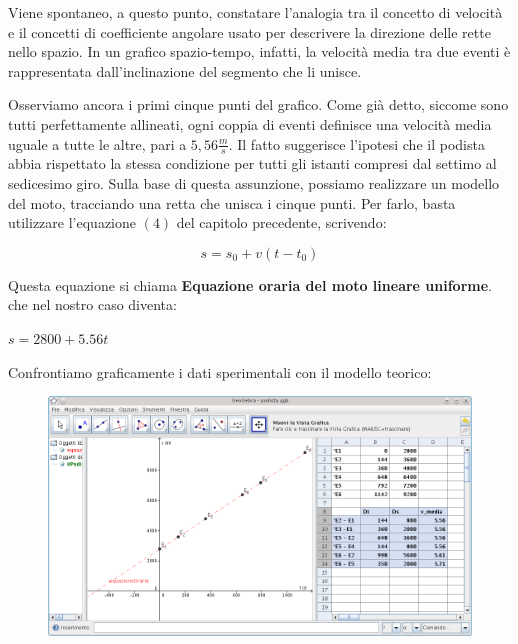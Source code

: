 Viene spontaneo, a questo punto, constatare l'analogia tra il concetto di velocità e il concetti di coefficiente angolare usato per descrivere la direzione delle rette nello spazio. In un grafico spazio-tempo, infatti, la velocità media tra due eventi è rappresentata dall'inclinazione del segmento che li unisce.
\newline

Osserviamo ancora i primi cinque punti del grafico. Come già detto, siccome sono tutti perfettamente allineati, ogni coppia di eventi definisce una velocità media uguale a tutte le altre, pari a $5,56 \frac ms$. Il fatto suggerisce l'ipotesi che il podista abbia rispettato la stessa condizione per tutti gli istanti compresi dal settimo al sedicesimo giro. Sulla base di questa assunzione, possiamo realizzare un modello del moto, tracciando una retta che unisca i cinque punti. Per farlo, basta utilizzare l'equazione $(4)$ del capitolo precedente, scrivendo:
\begin{center}
\begin{equation}
\label{eq:Equazione oraria del moto lineare uniforme}
s = s_0 + v (t -t_0)
\end{equation}
\end{center}
Questa equazione si chiama {\bf Equazione oraria del moto lineare uniforme}.\newline
che nel nostro caso diventa:
\begin{center}
\begin{math}
s = 2800 + 5.56 t
\end{math}
\end{center}
Confrontiamo graficamente i dati sperimentali con il modello teorico:
\begin{figure}[H]
 \centering
 \includegraphics[width=.7\textwidth]{../immagini/podista2.png}
 \label{fig:confronto dei dati con il modello}
\end{figure}


